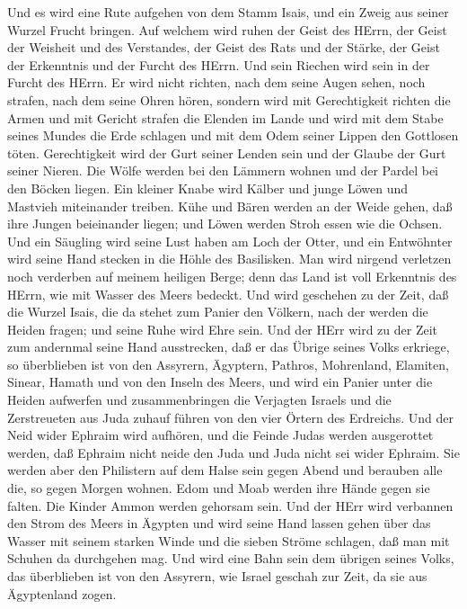  Und es wird eine Rute aufgehen von dem Stamm Isais, und ein
Zweig aus seiner Wurzel Frucht bringen.  Auf welchem wird
ruhen der Geist des HErrn, der Geist der Weisheit und des Verstandes,
der Geist des Rats und der Stärke, der Geist der Erkenntnis und der
Furcht des HErrn.  Und sein Riechen wird sein in der Furcht
des HErrn. Er wird nicht richten, nach dem seine Augen sehen, noch
strafen, nach dem seine Ohren hören,  sondern wird mit
Gerechtigkeit richten die Armen und mit Gericht strafen die Elenden im
Lande und wird mit dem Stabe seines Mundes die Erde schlagen und mit dem
Odem seiner Lippen den Gottlosen töten.  Gerechtigkeit wird
der Gurt seiner Lenden sein und der Glaube der Gurt seiner Nieren.
 Die Wölfe werden bei den Lämmern wohnen und der Pardel bei
den Böcken liegen. Ein kleiner Knabe wird Kälber und junge Löwen und
Mastvieh miteinander treiben.  Kühe und Bären werden an der
Weide gehen, daß ihre Jungen beieinander liegen; und Löwen werden Stroh
essen wie die Ochsen.  Und ein Säugling wird seine Lust
haben am Loch der Otter, und ein Entwöhnter wird seine Hand stecken in
die Höhle des Basilisken.  Man wird nirgend verletzen noch
verderben auf meinem heiligen Berge; denn das Land ist voll Erkenntnis
des HErrn, wie mit Wasser des Meers bedeckt.  Und wird
geschehen zu der Zeit, daß die Wurzel Isais, die da stehet zum Panier
den Völkern, nach der werden die Heiden fragen; und seine Ruhe wird Ehre
sein.  Und der HErr wird zu der Zeit zum andernmal seine
Hand ausstrecken, daß er das Übrige seines Volks erkriege, so
überblieben ist von den Assyrern, Ägyptern, Pathros, Mohrenland,
Elamiten, Sinear, Hamath und von den Inseln des Meers,  und
wird ein Panier unter die Heiden aufwerfen und zusammenbringen die
Verjagten Israels und die Zerstreueten aus Juda zuhauf führen von den
vier Örtern des Erdreichs.  Und der Neid wider Ephraim wird
aufhören, und die Feinde Judas werden ausgerottet werden, daß Ephraim
nicht neide den Juda und Juda nicht sei wider Ephraim.  Sie
werden aber den Philistern auf dem Halse sein gegen Abend und berauben
alle die, so gegen Morgen wohnen. Edom und Moab werden ihre Hände gegen
sie falten. Die Kinder Ammon werden gehorsam sein.  Und der
HErr wird verbannen den Strom des Meers in Ägypten und wird seine Hand
lassen gehen über das Wasser mit seinem starken Winde und die sieben
Ströme schlagen, daß man mit Schuhen da durchgehen mag. 
Und wird eine Bahn sein dem übrigen seines Volks, das überblieben ist
von den Assyrern, wie Israel geschah zur Zeit, da sie aus Ägyptenland
zogen.

